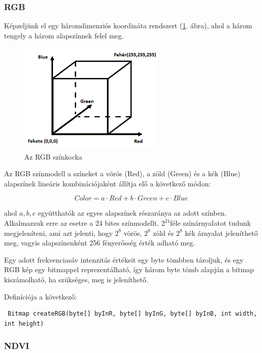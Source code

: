\documentclass[a4paper,12pt]{article}
\begin{document}
\subsubsection{RGB}

Képzeljünk el egy háromdimenziós koordináta rendszert (\ref{fig:rgb1}. ábra), ahol a három tengely a három alapszínnek felel meg. 

\begin{figure}
	\centering
	\includegraphics[width=7cm]{rgb1.png}
	\caption{Az RGB színkocka}
	\label{fig:rgb1}
\end{figure}  

Az RGB színmodell a színeket a vörös (Red), a zöld (Green) és a kék (Blue) alapszínek lineáris kombinációjaként állítja elő a következő módon:

\begin{equation} \label{formula:rgb}
Color = a \cdot Red + b \cdot Green + c \cdot Blue
\end{equation}


ahol $a,b,c$ együtthatók az egyes alapszínek részaránya az adott színben. Alkalmazzuk erre az esetre a 24 bites színmodellt. $2^{24}$féle színárnyalatot tudunk megjeleníteni, ami azt jelenti, hogy $2^8$ vörös, $2^8$ zöld és $2^8$ kék árnyalat jeleníthető meg, vagyis alapszínenként 256 fényerősség érték adható meg.

Egy adott frekvenciasáv intenzitás értékeit egy byte tömbben tároljuk, és egy RGB kép egy bitmappel reprezentálható, így három byte tömb alapján a bitmap kiszámolható, ha szükséges, meg is jeleníthető.

Definíciója a következő: 
\small
\begin{verbatim} Bitmap createRGB(byte[] byInR, byte[] byInG, byte[] byInB, int width, 
int height) \end{verbatim}

\subsubsection{NDVI}
\end{document}

